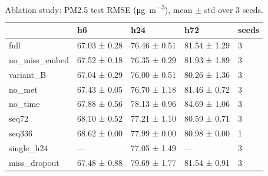 \begin{table}
\caption{Ablation study: PM2.5 test RMSE (\si{\micro\gram\per\cubic\metre}), mean $\pm$ std over 3 seeds.}
\label{tab:ablations}
\begin{tabular}{lllll}
\toprule
 & h6 & h24 & h72 & seeds \\
\midrule
full & 67.03 ± 0.28 & 76.46 ± 0.51 & 81.54 ± 1.29 & 3 \\
no\_miss\_embed & 67.52 ± 0.18 & 76.35 ± 0.29 & 81.93 ± 1.89 & 3 \\
variant\_B & 67.04 ± 0.29 & 76.00 ± 0.51 & 80.26 ± 1.36 & 3 \\
no\_met & 67.43 ± 0.05 & 76.70 ± 1.18 & 81.46 ± 0.72 & 3 \\
no\_time & 67.88 ± 0.56 & 78.13 ± 0.96 & 84.69 ± 1.06 & 3 \\
seq72 & 68.10 ± 0.52 & 77.21 ± 1.10 & 80.59 ± 0.71 & 3 \\
seq336 & 68.62 ± 0.00 & 77.99 ± 0.00 & 80.98 ± 0.00 & 1 \\
single\_h24 & — & 77.05 ± 1.49 & — & 3 \\
miss\_dropout & 67.48 ± 0.88 & 79.69 ± 1.77 & 81.54 ± 0.91 & 3 \\
\bottomrule
\end{tabular}
\end{table}
